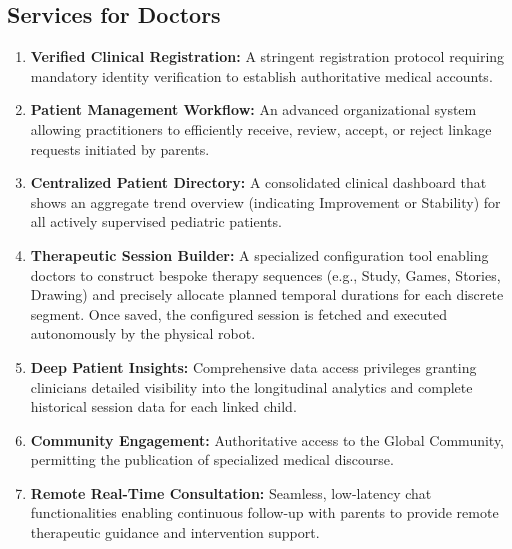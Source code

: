\documentclass[12pt,a4paper]{report}
\begin{document}
\subsection{Services for Doctors}

\begin{enumerate}
    \item \textbf{Verified Clinical Registration:} A stringent registration protocol requiring mandatory identity verification to establish authoritative medical accounts.
    \item \textbf{Patient Management Workflow:} An advanced organizational system allowing practitioners to efficiently receive, review, accept, or reject linkage requests initiated by parents.
    \item \textbf{Centralized Patient Directory:} A consolidated clinical dashboard that shows an aggregate trend overview (indicating Improvement or Stability) for all actively supervised pediatric patients.
    \item \textbf{Therapeutic Session Builder:} A specialized configuration tool enabling doctors to construct bespoke therapy sequences (e.g., Study, Games, Stories, Drawing) and precisely allocate planned temporal durations for each discrete segment. Once saved, the configured session is fetched and executed autonomously by the physical robot.
    \item \textbf{Deep Patient Insights:} Comprehensive data access privileges granting clinicians detailed visibility into the longitudinal analytics and complete historical session data for each linked child.
    \item \textbf{Community Engagement:} Authoritative access to the Global Community, permitting the publication of specialized medical discourse.
    \item \textbf{Remote Real-Time Consultation:} Seamless, low-latency chat functionalities enabling continuous follow-up with parents to provide remote therapeutic guidance and intervention support.
\end{enumerate}
\end{document}
